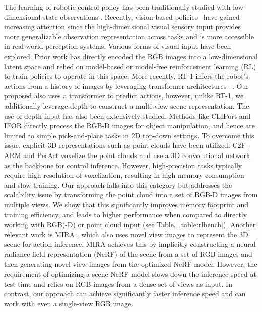  The learning of robotic control policy has been traditionally studied with low-dimensional state observations \cite{andrychowicz2020learning, hwangbo2019learning, kumar2021rma, schulman2017proximal, xu2019learning}. Recently, vision-based policies~\cite{anderson2018evaluation,goyal2020packit,shah2021ving,yang2021learning,huang2021generalization,chen2021system,yu2021visuallocomotion,shah2022offline} have gained increasing attention since the high-dimensional visual sensory input provides more generalizable observation representation across tasks and is more accessible in real-world perception systems. Various forms of visual input have been explored. Prior work has directly encoded the RGB images into a low-dimensional latent space and relied on model-based \cite{hafner2019dream, watter2015embed} or model-free \cite{yarats2021image, yarats2022mastering} reinforcement learning (RL) to train policies to operate in this space. More recently, RT-1 \cite{rt12022arxiv} infers the robot's actions from a history of images by leveraging transformer architectures ~\cite{vaswani2017attention}. Our proposed \method also uses a transformer to predict actions, however, unlike RT-1, we additionally leverage depth to construct a multi-view scene representation. The use of depth input has also been extensively studied. Methods like CLIPort \cite{shridhar2021cliport} and IFOR \cite{goyal2022ifor} directly process the RGB-D images for object manipulation, and hence are limited to simple pick-and-place tasks in 2D top-down settings. To overcome this issue, explicit 3D representations such as point clouds have been utilized. C2F-ARM \cite{c2farm} and PerAct \cite{peract2022arxiv} voxelize the point clouds and use a 3D convolutional network as the backbone for control inference. However, high-precision tasks typically require high resolution of voxelization, resulting in high memory consumption and slow training. Our approach falls into this category but addresses the scalability issue by transforming the point cloud into a set of RGB-D images from multiple views. We show that this significantly improves memory footprint and training efficiency, and leads to higher performance when compared to directly working with RGB(-D) or point cloud input (see Table.~\ref{table:rlbench}). Another relevant work is MIRA \cite{lin2022mira}, which also uses novel view images to represent the 3D scene for action inference. MIRA achieves this by implicitly constructing a neural radiance field representation (NeRF) of the scene from a set of RGB images and then generating novel view images from the optimized NeRF model. However, the requirement of optimizing a scene NeRF model slows down the inference speed at test time and relies on RGB images from a dense set of views as input. In contrast, our approach can achieve significantly faster inference speed and can work with even a single-view RGB image.

